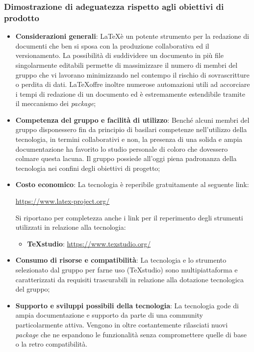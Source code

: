 \documentclass[./../Technology Baseline.tex]{subfiles}
\begin{document}
\subsubsection{Dimostrazione di adeguatezza rispetto agli obiettivi di prodotto}
\begin{itemize}
	\item \textbf{Considerazioni generali}: \LaTeX è un potente strumento per la redazione di documenti che ben si sposa con la produzione collaborativa ed il versionamento. La possibilità di suddividere un documento in più file singolarmente editabili permette di massimizzare il numero di membri del gruppo che vi lavorano minimizzando nel contempo il rischio di sovrascritture o perdita di dati. \LaTeX offre inoltre numerose automazioni utili ad accorciare i tempi di redazione di un documento ed è estremamente estendibile tramite il meccanismo dei \textit{package};
	\item \textbf{Competenza del gruppo e facilità di utilizzo}: Benché alcuni membri del gruppo disponessero fin da principio di basilari competenze nell'utilizzo della tecnologia, in termini collaborativi e non, la presenza di una solida e ampia documentazione ha favorito lo studio personale di coloro che dovessero colmare questa lacuna. Il gruppo possiede all'oggi piena padronanza della tecnologia nei confini degli obiettivi di progetto;
	\item \textbf{Costo economico}: La tecnologia è reperibile gratuitamente al seguente link:
	\begin{center}
		\url{https://www.latex-project.org/}
	\end{center}
	Si riportano per completezza anche i link per il reperimento degli strumenti utilizzati in relazione alla tecnologia:
	\begin{itemize}
		\item \textbf{TeXstudio}: \url{https://www.texstudio.org/}
	\end{itemize}
	\item \textbf{Consumo di risorse e compatibilità}: La tecnologia e lo strumento selezionato dal gruppo per farne uso (TeXstudio) sono multipiattaforma e caratterizzati da requisiti trascurabili in relazione alla dotazione tecnologica del gruppo;
	\item \textbf{Supporto e sviluppi possibili della tecnologia}: La tecnologia gode di ampia documentazione e supporto da parte di una community particolarmente attiva. Vengono in oltre costantemente rilasciati nuovi \textit{package} che ne espandono le funzionalità senza compromettere quelle di base o la retro compatibilità.
\end{itemize}
\end{document}

